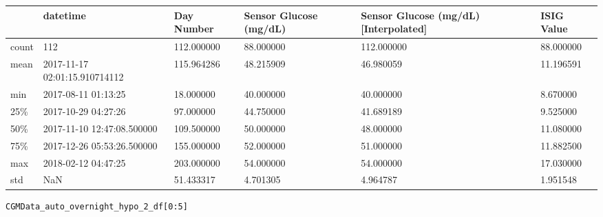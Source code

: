 \bigskip\noindent
\begin{tabular}{p{}p{}p{}p{}p{}p{}}
\toprule
 & datetime & Day Number & Sensor Glucose (mg/dL) & Sensor Glucose (mg/dL) [Interpolated] & ISIG Value \\
\hline
count & 112 & 112.000000 & 88.000000 & 112.000000 & 88.000000 \\
\hline
mean & 2017-11-17 02:01:15.910714112 & 115.964286 & 48.215909 & 46.980059 & 11.196591 \\
\hline
min & 2017-08-11 01:13:25 & 18.000000 & 40.000000 & 40.000000 & 8.670000 \\
\hline
25\% & 2017-10-29 04:27:26 & 97.000000 & 44.750000 & 41.689189 & 9.525000 \\
\hline
50\% & 2017-11-10 12:47:08.500000 & 109.500000 & 50.000000 & 48.000000 & 11.080000 \\
\hline
75\% & 2017-12-26 05:53:26.500000 & 155.000000 & 52.000000 & 51.000000 & 11.882500 \\
\hline
max & 2018-02-12 04:47:25 & 203.000000 & 54.000000 & 54.000000 & 17.030000 \\
\hline
std & NaN & 51.433317 & 4.701305 & 4.964787 & 1.951548 \\
\hline
\bottomrule
\end{tabular}

\bigskip

\begin{verbatim}
CGMData_auto_overnight_hypo_2_df[0:5]
\end{verbatim}

